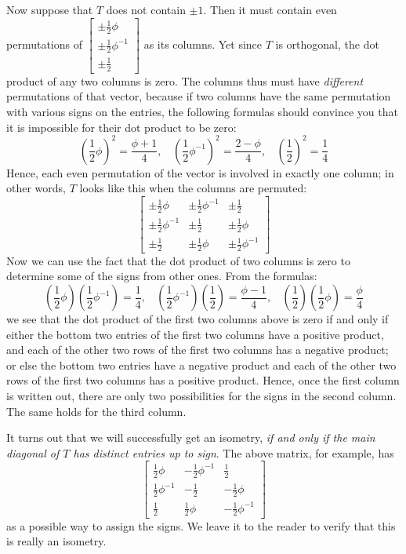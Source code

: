 \documentclass[leqno]{book}
\begin{document}
Now suppose that $T$ does not contain $\pm 1$.  Then it must contain even permutations of $\begin{bmatrix}\pm\frac 12\phi\\\pm\frac 12\phi^{-1}\\\pm\frac 12\end{bmatrix}$ as its columns.  Yet since $T$ is orthogonal, the dot product of any two columns is zero.  The columns thus must have \emph{different} permutations of that vector, because if two columns have the same permutation with various signs on the entries, the following formulas should convince you that it is impossible for their dot product to be zero:
$$\left(\frac 12\phi\right)^2=\frac{\phi+1}4,~~~~\left(\frac 12\phi^{-1}\right)^2=\frac{2-\phi}4,~~~~\left(\frac 12\right)^2=\frac 14$$
Hence, each even permutation of the vector is involved in exactly one column; in other words, $T$ looks like this when the columns are permuted:
$$\begin{bmatrix}\pm\frac 12\phi&\pm\frac 12\phi^{-1}&\pm\frac 12\\\pm\frac 12\phi^{-1}&\pm\frac 12&\pm\frac 12\phi\\\pm\frac 12&\pm\frac 12\phi&\pm\frac 12\phi^{-1}\end{bmatrix}$$
Now we can use the fact that the dot product of two columns is zero to determine some of the signs from other ones.  From the formulas:
$$\left(\frac 12\phi\right)\left(\frac 12\phi^{-1}\right)=\frac 14,~~~~\left(\frac 12\phi^{-1}\right)\left(\frac 12\right)=\frac{\phi-1}4,~~~~\left(\frac 12\right)\left(\frac 12\phi\right)=\frac{\phi}4$$
we see that the dot product of the first two columns above is zero if and only if either the bottom two entries of the first two columns have a positive product, and each of the other two rows of the first two columns has a negative product; or else the bottom two entries have a negative product and each of the other two rows of the first two columns has a positive product.  Hence, once the first column is written out, there are only two possibilities for the signs in the second column.  The same holds for the third column.

It turns out that we will successfully get an isometry, \emph{if and only if the main diagonal of $T$ has distinct entries up to sign}.  The above matrix, for example, has
$$\begin{bmatrix}\frac 12\phi&-\frac 12\phi^{-1}&\frac 12\\\frac 12\phi^{-1}&-\frac 12&-\frac 12\phi\\\frac 12&\frac 12\phi&-\frac 12\phi^{-1}\end{bmatrix}$$
as a possible way to assign the signs.  We leave it to the reader to verify that this is really an isometry.
\end{document}
